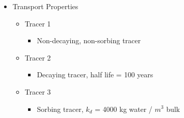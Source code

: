 \documentclass{beamer}
\begin{document}
\begin{frame}
	\begin{itemize}
		\item Transport Properties
		\begin{itemize}
			\item Tracer 1
			\begin{itemize}
				\item Non-decaying, non-sorbing tracer
			\end{itemize}
			\item Tracer 2
			\begin{itemize}
				\item Decaying tracer, half life = 100 years
			\end{itemize}
			\item Tracer 3
			\begin{itemize}
				\item Sorbing tracer, $k_{d}$ = 4000 kg water / $m^{3}$ bulk
			\end{itemize}
		\end{itemize}
	\end{itemize}
	
\end{frame}


\end{document}
